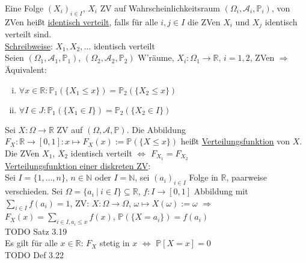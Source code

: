 \documentclass[a4paper]{article}
\newcommand{\ul}{\underline}
\begin{document}
Eine Folge $(X_i)_{i\in I}$, $X_i$ ZV auf Wahrscheinlichkeitsraum $(\Omega_i,\mathcal{A}_i,\mathbb{P}_i)$, von ZVen heißt \ul{identisch verteilt}, falls für alle $i,j\in I$ die ZVen $X_i$ und $X_j$ identisch verteilt sind.\\
\ul{Schreibweise}: $X_1,X_2,\dots$ identisch verteilt\\
Seien $(\Omega_1,\mathcal{A}_1,\mathbb{P}_1)$, $(\Omega_2,\mathcal{A}_2,\mathbb{P}_2)$ W'räume, $X_i:\Omega_1\rightarrow\mathbb{R}$, $i=1,2$, ZVen $\Rightarrow$ Äquivalent:
\begin{enumerate}[(i)]
	\item $\forall x\in\mathbb{R}:\mathbb{P}_1(\{X_1\leq x\})=\mathbb{P}_2(\{X_2\leq x\})$
	\item $\forall I\in J:\mathbb{P}_1(\{X_1\in I\})=\mathbb{P}_2(\{X_2\in I\})$
\end{enumerate}
Sei $X:\Omega\rightarrow\mathbb{R}$ ZV auf $(\Omega,\mathcal{A},\mathbb{P})$. Die Abbildung $F_X:\mathbb{R}\rightarrow\left[0,1\right]:x\mapsto F_X(x):=\mathbb{P}(\{X\leq x\})$ heißt \ul{Verteilungsfunktion} von $X$.\\
Die ZVen $X_1$, $X_2$ identisch verteilt $\Leftrightarrow$ $F_{X_1}=F_{X_2}$\\
\ul{Verteilungsfunktion einer diskreten ZV}:\\
Sei $I=\{1,\dots,n\}$, $n\in\mathbb{N}$ oder $I=\mathbb{N}$, sei $(a_i)_{i\in I}$ Folge in $\mathbb{R}$, paarweise verschieden. Sei $\Omega=\{a_i\ \vert\ i\in I\}\subseteq\mathbb{R}$, $f:I\rightarrow\left[0,1\right]$ Abbildung mit $\sum_{i\in I}f(a_i)=1$, ZV: $X:\Omega\rightarrow\Omega$, $\omega\mapsto X(\omega):=\omega$ $\Rightarrow$ $F_X(x)=\sum_{i\in I,a_i\leq x}f(x)$, $\mathbb{P}(\{X=a_i\})=f(a_i)$\\
TODO Satz 3.19\\
Es gilt für alle $x\in\mathbb{R}$: $F_X$ stetig in $x$ $\Leftrightarrow$ $\mathbb{P}\left[X=x\right]=0$\\
TODO Def 3.22\\
\end{document}
